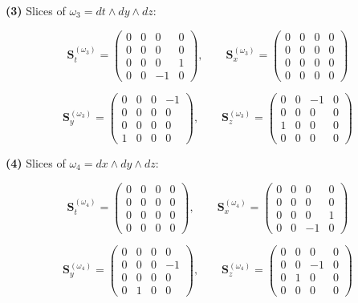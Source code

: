 \documentclass[a4paper,12pt,openany]{book}
\begin{document}
\textbf{(3)} Slices of \(\omega_3 = dt\wedge dy\wedge dz\):

\[
\mathbf{S}_{t}^{(\omega_3)}=\begin{pmatrix}0&0&0&0\\[2pt]0&0&0&0\\[2pt]0&0&0&1\\[2pt]0&0&-1&0\end{pmatrix},\qquad
\mathbf{S}_{x}^{(\omega_3)}=\begin{pmatrix}0&0&0&0\\[2pt]0&0&0&0\\[2pt]0&0&0&0\\[2pt]0&0&0&0\end{pmatrix}
\]

\[
\mathbf{S}_{y}^{(\omega_3)}=\begin{pmatrix}0&0&0&-1\\[2pt]0&0&0&0\\[2pt]0&0&0&0\\[2pt]1&0&0&0\end{pmatrix},\qquad
\mathbf{S}_{z}^{(\omega_3)}=\begin{pmatrix}0&0&-1&0\\[2pt]0&0&0&0\\[2pt]1&0&0&0\\[2pt]0&0&0&0\end{pmatrix}
\]

\textbf{(4)} Slices of \(\omega_4 = dx\wedge dy\wedge dz\):

\[
\mathbf{S}_{t}^{(\omega_4)}=\begin{pmatrix}0&0&0&0\\[2pt]0&0&0&0\\[2pt]0&0&0&0\\[2pt]0&0&0&0\end{pmatrix},\qquad
\mathbf{S}_{x}^{(\omega_4)}=\begin{pmatrix}0&0&0&0\\[2pt]0&0&0&0\\[2pt]0&0&0&1\\[2pt]0&0&-1&0\end{pmatrix}
\]

\[
\mathbf{S}_{y}^{(\omega_4)}=\begin{pmatrix}0&0&0&0\\[2pt]0&0&0&-1\\[2pt]0&0&0&0\\[2pt]0&1&0&0\end{pmatrix},\qquad
\mathbf{S}_{z}^{(\omega_4)}=\begin{pmatrix}0&0&0&0\\[2pt]0&0&-1&0\\[2pt]0&1&0&0\\[2pt]0&0&0&0\end{pmatrix}
\]
\end{document}
